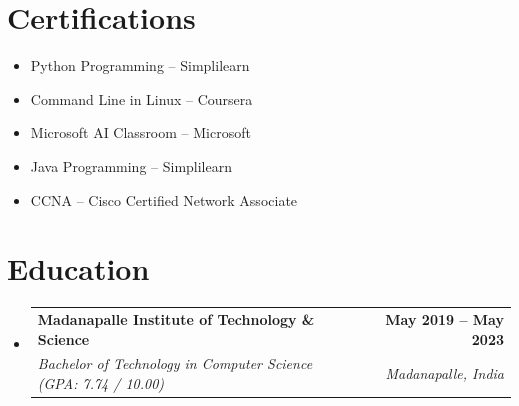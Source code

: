 \documentclass[letterpaper,11pt]{article}
\makeatletter
\newcommand{\resumeSubheading}[4]{
  \vspace{-2pt}\item
    \begin{tabular*}{1.0\textwidth}[t]{l@{\extracolsep{\fill}}r}
      \textbf{\large#1} & \textbf{\small #2} \\
      \textit{\large#3} & \textit{\small #4} \\
     
    \end{tabular*}\vspace{-7pt}
}
\newcommand{\resumeSubHeadingListStart}{\begin{itemize}[leftmargin=0.0in, label={}]}
\newcommand{\resumeSubHeadingListEnd}{\end{itemize}}
\makeatother
\begin{document}
\section{Certifications}
\begin{itemize}[leftmargin=0.2cm, itemsep=1pt]
    \item Python Programming -- Simplilearn
    \item Command Line in Linux -- Coursera
    \item Microsoft AI Classroom -- Microsoft
    \item Java Programming -- Simplilearn
    \item CCNA -- Cisco Certified Network Associate
\end{itemize}
\vspace{6pt}

\section{Education}
\resumeSubHeadingListStart
  \resumeSubheading
    {Madanapalle Institute of Technology \& Science}{May 2019 -- May 2023}
    {Bachelor of Technology in Computer Science (GPA: 7.74 / 10.00)}{Madanapalle, India}
\resumeSubHeadingListEnd
\end{document}
